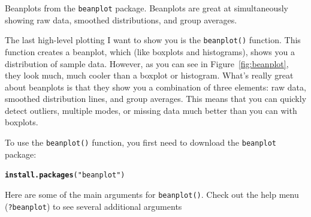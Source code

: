 \documentclass{tufte-book}\usepackage[]{graphicx}\usepackage[]{color}
\makeatletter
\newcommand{\hlstr}[1]{\textcolor[rgb]{0.192,0.494,0.8}{#1}}%
\newcommand{\hlstd}[1]{\textcolor[rgb]{0.345,0.345,0.345}{#1}}%
\newcommand{\hlkwd}[1]{\textcolor[rgb]{0.737,0.353,0.396}{\textbf{#1}}}%
\newenvironment{kframe}{%
 \def\at@end@of@kframe{}%
 \ifinner\ifhmode%
  \def\at@end@of@kframe{\end{minipage}}%
  \begin{minipage}{\columnwidth}%
 \fi\fi%
 \def\FrameCommand##1{\hskip\@totalleftmargin \hskip-\fboxsep
 \colorbox{shadecolor}{##1}\hskip-\fboxsep
     \hskip-\linewidth \hskip-\@totalleftmargin \hskip\columnwidth}%
 \MakeFramed {\advance\hsize-\width
   \@totalleftmargin\z@ \linewidth\hsize
   \@setminipage}}%
 {\par\unskip\endMakeFramed%
 \at@end@of@kframe}
\newenvironment{knitrout}{}{} %
\newcommand{\newfun}[1]{\begin{LARGE} \begin{center} \texttt{#1} \end{center} \end{LARGE}}
\makeatother
\begin{document}
\begin{footnotesize}
\begin{marginfigure}
\begin{tiny}
\begin{knitrout}
\end{knitrout}
\end{tiny}
\caption{Beanplots from the \texttt{beanplot} package. Beanplots are great at simultaneously showing raw data, smoothed distributions, and group averages.}
\label{fig:beanplot}
\end{marginfigure}

The last high-level plotting I want to show you is the \texttt{beanplot()} function. This function creates a beanplot, which (like boxplots and histograms), shows you a distribution of sample data. However, as you can see in Figure~\ref{fig:beanplot}, they look much, much cooler than a boxplot or histogram. What's really great about beanplots is that they show you a combination of three elements: raw data, smoothed distribution lines, and group averages. This means that you can quickly detect outliers, multiple modes, or missing data much better than you can with boxplots.

To use the \texttt{beanplot()} function, you first need to download the \texttt{beanplot} package:

\begin{footnotesize}
\begin{knitrout}
\color{fgcolor}\begin{kframe}
\begin{alltt}
\hlkwd{install.packages}\hlstd{(}\hlstr{"beanplot"}\hlstd{)}
\end{alltt}
\end{kframe}
\end{knitrout}
\end{footnotesize}

Here are some of the main arguments for \texttt{beanplot()}. Check out the help menu (\texttt{?beanplot}) to see several additional arguments


\vspace{5mm} %
\noindent
\setlength{\fboxrule}{1.5pt}
\fbox{
\parbox{\textwidth}{

\newfun{beanplot()}\index{beanplot()}

\hline

\begin{description}


\end{description}}}
\end{footnotesize}
\end{document}
